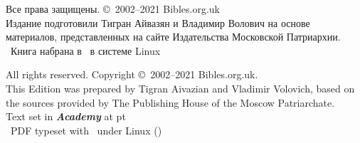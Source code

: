 \begin{center}
\fontsize{9}{12}\selectfont
Все права защищены. \copyright\ 2002--2021 Bibles.org.uk\\
Издание подготовили Тигран Айвазян и Владимир Волович на основе материалов, представленных на сайте Издательства Московской Патриархии.\\
\tux\ Книга набрана в \XeLaTeX\ в системе Linux\\
\vspace*{1mm}

\copyrsepline

\vspace*{1mm}
All rights reserved. Copyright \copyright\ 2002--2021 Bibles.org.uk.\\
This Edition was prepared by Tigran Aivazian and Vladimir Volovich, based on the sources provided by The Publishing House of the Moscow Patriarchate.\\
Text set in \textbf{\itshape Academy} at \bibmainfontsize pt\\
\tux\ PDF typeset with \XeLaTeX\ under Linux (\mytoday)\\
\end{center}
